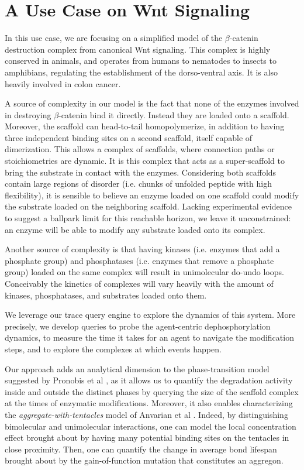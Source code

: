 \section{A Use Case on Wnt Signaling}\label{sec:use-case}

In this use case, we are focusing on a simplified model of the
$\beta$-catenin destruction complex from canonical Wnt signaling. This
complex is highly conserved in animals, and operates from humans to
nematodes to insects to amphibians, regulating the establishment of
the dorso-ventral axis. It is also heavily involved in colon cancer.

A source of complexity in our model is the fact that none of the
enzymes involved in destroying $\beta$-catenin bind it directly.
Instead they are loaded onto a scaffold. Moreover, the scaffold can
head-to-tail homopolymerize, in addition to having three independent
binding sites on a second scaffold, itself capable of dimerization.
This allows a complex of scaffolds, where connection
paths or stoichiometries are dynamic. It is this complex that acts as a
super-scaffold to bring the substrate in contact with the
enzymes. Considering both scaffolds contain large regions of disorder
(i.e. chunks of unfolded peptide with high flexibility), it is
sensible to believe an enzyme loaded on one scaffold could modify the
substrate loaded on the neighboring scaffold. Lacking experimental
evidence to suggest a ballpark limit for this reachable horizon, we
leave it unconstrained: an enzyme will be able to modify any substrate
loaded onto its complex.

Another source of complexity is that having kinases (i.e. enzymes that
add a phosphate group) and phosphatases (i.e. enzymes that remove a
phosphate group) loaded on the same complex will result in
unimolecular do-undo loops. Conceivably the kinetics of complexes will
vary heavily with the amount of kinases, phosphatases, and substrates
loaded onto them. %

\bigskip

We leverage our trace query engine to explore the dynamics of this
system. More precisely, we develop queries to probe the agent-centric
dephosphorylation dynamics, to measure the time it takes for an agent
to navigate the modification steps, and to explore the complexes at
which events happen.

Our approach adds an analytical dimension to the phase-transition
model suggested by Pronobis et al \cite{pronobis2017reconstituting},
as it allows us to quantify the degradation activity inside and
outside the distinct phases by querying the size of the scaffold
complex at the times of enzymatic modifications. Moreover, it also
enables characterizing the \emph{aggregate-with-tentacles} model of
Anvarian et al \cite{anvarian2016axin}. Indeed, by distinguishing
bimolecular and unimolecular interactions, one can model the local
concentration effect brought about by having many potential binding
sites on the tentacles in close proximity. Then, one can quantify the
change in average bond lifespan brought about by the gain-of-function
mutation that constitutes an aggregon.

